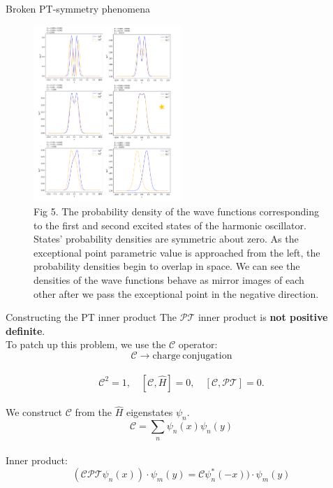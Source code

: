 \documentclass[10pt]{beamer}
\begin{document}
\begin{frame}{Broken PT-symmetry phenomena}
\begin{figure}
    \hspace{-4.5em}
    \includegraphics[width=0.5\textwidth]{amplitudes.pdf}
    \\
    \tiny{Fig 5. The probability density of the wave functions corresponding to the first and second excited states of the harmonic oscillator. States' probability densities are symmetric about zero. As the exceptional point parametric value is approached from the left, the probability densities begin to overlap in space. We can see the densities of the wave functions behave as mirror images of each other after we pass the exceptional point in the negative direction.}
    \end{figure}
\end{frame}

\begin{frame}{Constructing the PT inner product}
The $\mathcal{PT}$ inner product is \textbf{not positive definite}.\\
To patch up this problem, we use the $\mathcal{C}$ operator:\\
\begin{equation*}
\mathcal{C} \rightarrow \mathrm{charge\: conjugation}
    \end{equation*}\\
\begin{equation*}
\mathcal{C}^2 = 1,\quad [\mathcal{C}, \hat{H}] = 0,\quad [\mathcal{C},\mathcal{PT}] = 0.
    \end{equation*}\\
\vspace{0.5cm}
We construct $\mathcal{C}$ from the $\hat{H}$ eigenstates $\psi_n$.\\
\begin{equation*}
\mathcal{C} = \sum_{n} \psi_{n}(x) \psi_{n}(y)
    \end{equation*}\\
Inner product: 
\begin{equation*}(\mathcal{CPT} \psi_{n}(x)) \cdot \psi_{m}(y) = \mathcal{C} \psi^{*}_{n}(-x)) \cdot \psi_{m}(y)
\end{equation*}
\end{frame}

\end{document}
